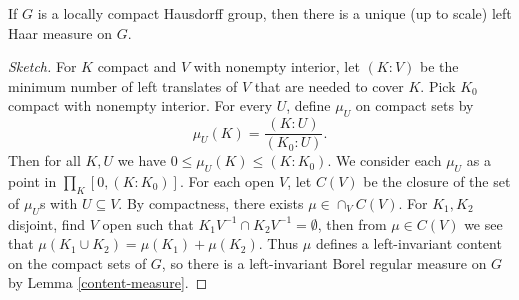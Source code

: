 \documentclass[letterpaper,11pt]{report}
\begin{document}
\begin{thm} If $G$ is a locally compact Hausdorff group, then there is a unique (up to scale) left Haar measure on $G$.
\end{thm}
\begin{proof}[Sketch] For $K$ compact and $V$ with nonempty interior, let $(K:V)$ be the minimum number of left translates of $V$ that are needed to cover $K$. Pick $K_0$ compact with nonempty interior. For every $U$, define $\mu_U$ on compact sets by
\[
\mu_U(K) = \frac{(K:U)}{(K_0:U)}.
\]
Then for all $K,U$ we have $0 \le \mu_U(K) \le (K:K_0)$. We consider each $\mu_U$ as a point in $\prod_K [0,(K:K_0)]$. For each open $V$, let $C(V)$ be the closure of the set of $\mu_U$s with $U \subseteq V$. By compactness, there exists $\mu \in \cap_V C(V)$. For $K_1, K_2$ disjoint, find $V$ open such that $K_1V^{-1} \cap K_2V^{-1} = \emptyset$, then from $\mu \in C(V)$ we see that $\mu(K_1 \cup K_2) = \mu(K_1) + \mu(K_2)$. Thus $\mu$ defines a left-invariant content on the compact sets of $G$, so there is a left-invariant Borel regular measure on $G$ by Lemma \ref{content-measure}.




\end{proof}
\end{document}
